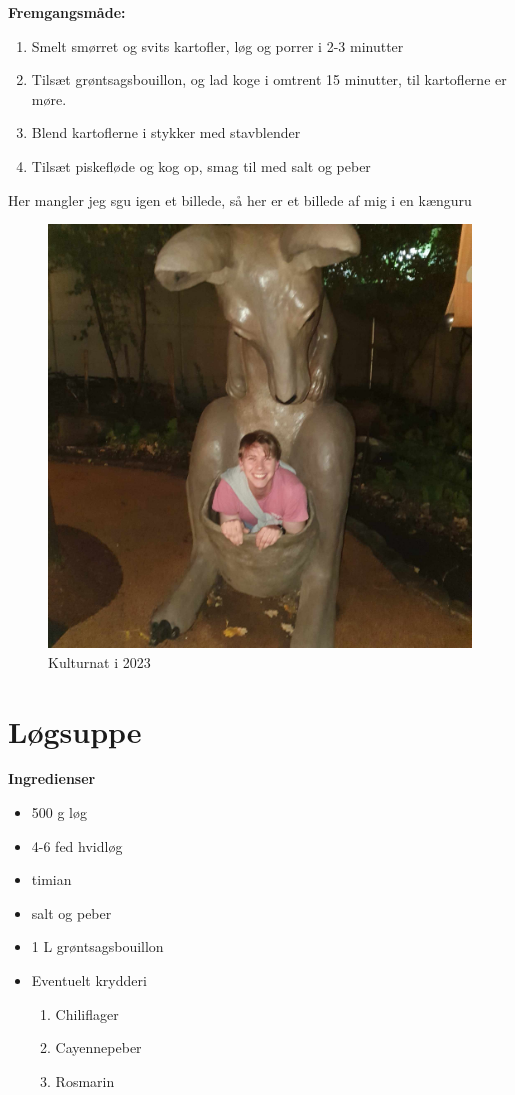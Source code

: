 \documentclass{book}
\begin{document}
\begin{minipage}[t]{0.5\textwidth}
\textbf{Fremgangsmåde:}
\begin{enumerate}
    \item Smelt smørret og svits kartofler, løg og porrer i 2-3 minutter
    \item Tilsæt grøntsagsbouillon, og lad koge i omtrent 15 minutter, til kartoflerne er møre.
    \item Blend kartoflerne i stykker med stavblender
    \item Tilsæt piskefløde og kog op, smag til med salt og peber
\end{enumerate}
\end{minipage}
\newpage Her mangler jeg sgu igen et billede, så her er et billede af mig i en kænguru 
\begin{figure}
    \centering
    \includegraphics[width=0.5\linewidth]{Kenguru.jpeg}
    \caption{Kulturnat i 2023}
    
\end{figure}
\newpage \section{Løgsuppe}
\begin{minipage}[t]{0.5\textwidth}
\textbf{Ingredienser}
\begin{itemize}
    \item 500 g løg 
    \item 4-6 fed hvidløg
    \item timian
    \item salt og peber
    \item 1 L grøntsagsbouillon
    \item Eventuelt krydderi
    \begin{enumerate}
        \item Chiliflager
        \item Cayennepeber
        \item Rosmarin
    \end{enumerate}
\end{itemize}
\end{minipage}
\end{document}
